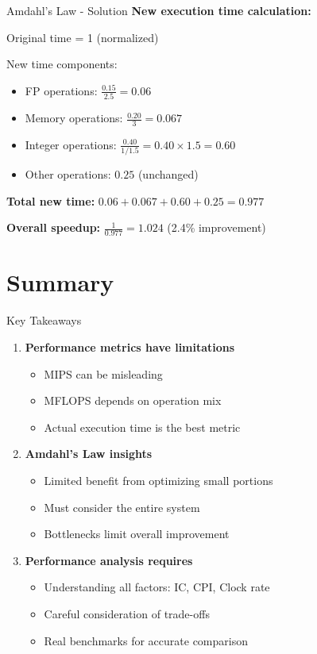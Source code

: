\documentclass[aspectratio=169,12pt]{beamer}
\begin{document}
\begin{frame}{Amdahl's Law - Solution}
\textbf{New execution time calculation:}

Original time = 1 (normalized)

New time components:
\begin{itemize}
    \item FP operations: $\frac{0.15}{2.5} = 0.06$
    \item Memory operations: $\frac{0.20}{3} = 0.067$
    \item Integer operations: $\frac{0.40}{1/1.5} = 0.40 \times 1.5 = 0.60$
    \item Other operations: $0.25$ (unchanged)
\end{itemize}

\textbf{Total new time:} $0.06 + 0.067 + 0.60 + 0.25 = 0.977$

\textbf{Overall speedup:} $\frac{1}{0.977} = 1.024$ (2.4\% improvement)
\end{frame}

\section{Summary}
\begin{frame}{Key Takeaways}
\begin{enumerate}
    \item \textbf{Performance metrics have limitations}
    \begin{itemize}
        \item MIPS can be misleading
        \item MFLOPS depends on operation mix
        \item Actual execution time is the best metric
    \end{itemize}
    
    \item \textbf{Amdahl's Law insights}
    \begin{itemize}
        \item Limited benefit from optimizing small portions
        \item Must consider the entire system
        \item Bottlenecks limit overall improvement
    \end{itemize}
    
    \item \textbf{Performance analysis requires}
    \begin{itemize}
        \item Understanding all factors: IC, CPI, Clock rate
        \item Careful consideration of trade-offs
        \item Real benchmarks for accurate comparison
    \end{itemize}
\end{enumerate}
\end{frame}
\end{document}
